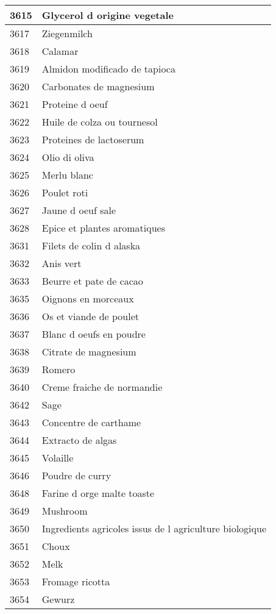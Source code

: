 \begin{longtable}{|l|l|}
3615 & Glycerol d origine vegetale \\ \hline 
3617 & Ziegenmilch \\ \hline 
3618 & Calamar \\ \hline 
3619 & Almidon modificado de tapioca \\ \hline 
3620 & Carbonates de magnesium \\ \hline 
3621 & Proteine d oeuf \\ \hline 
3622 & Huile de colza ou tournesol \\ \hline 
3623 & Proteines de lactoserum \\ \hline 
3624 & Olio di oliva \\ \hline 
3625 & Merlu blanc \\ \hline 
3626 & Poulet roti \\ \hline 
3627 & Jaune d oeuf sale \\ \hline 
3628 & Epice et plantes aromatiques \\ \hline 
3631 & Filets de colin d alaska \\ \hline 
3632 & Anis vert \\ \hline 
3633 & Beurre et pate de cacao \\ \hline 
3635 & Oignons en morceaux \\ \hline 
3636 & Os et viande de poulet \\ \hline 
3637 & Blanc d oeufs en poudre \\ \hline 
3638 & Citrate de magnesium \\ \hline 
3639 & Romero \\ \hline 
3640 & Creme fraiche de normandie \\ \hline 
3642 & Sage \\ \hline 
3643 & Concentre de carthame \\ \hline 
3644 & Extracto de algas \\ \hline 
3645 & Volaille \\ \hline 
3646 & Poudre de curry \\ \hline 
3648 & Farine d orge malte toaste \\ \hline 
3649 & Mushroom \\ \hline 
3650 & Ingredients agricoles issus de l agriculture biologique \\ \hline 
3651 & Choux \\ \hline 
3652 & Melk \\ \hline 
3653 & Fromage ricotta \\ \hline 
3654 & Gewurz \\ \hline 

\end{longtable}
